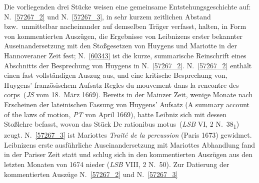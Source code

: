 %  
%
%
%
%
%
\frenchspacing
%
\begin{ledgroup}
\footnotesize
\pstart
\noindent
%
Die vorliegenden drei Stücke weisen eine gemeinsame Entstehungsgeschichte auf:
%
N.~\ref{57267_2} und N.~\ref{57267_3}, in sehr kurzem zeitlichen Abstand bzw.\ unmittelbar nacheinander auf demselben Träger verfasst,
%
halten, in Form von kommentierten Auszügen, die Ergebnisse von Leibnizens erster bekannter Auseinandersetzung mit den Stoßgesetzen von 
%
\protect{}Huygens und \protect{}Mariotte 
%
in der Hannoveraner Zeit fest;
%
N.~\ref{60343} ist die kurze, summarische Reinschrift eines Abschnitts der Besprechung von
%
\protect{}Huygens in N.~\ref{57267_2}.
\pend
%
\pstart
N.~\ref{57267_2} enthält einen fast vollständigen Auszug aus, und eine kritische Besprechung von, Huygens' französischem Aufsatz
%
\cite{00529}\glqq Regles du mouvement dans la rencontre des corps\grqq\ (\cite{00157}\textit{JS} vom 18.~März 1669).
%
Bereits in der Mainzer Zeit, wenige Monate nach Erscheinen der lateinischen Fassung von \protect{}Huygens' Aufsatz
%
(\cite{01067}\glqq A summary account of the laws of motion\grqq, \cite{00158}\textit{PT} von April 1669),
%
hatte Leibniz sich mit dessen Stoßlehre befasst, wovon das Stück 
%
\glqq De rationibus motus\grqq\ (\cite{02025}\textit{LSB} VI, 2 N.~38\textsubscript{1}) zeugt. 
%
N.~\ref{57267_3} ist \protect{}Mariottes \cite{00311}\textit{Traité de la percussion} (Paris 1673) gewidmet.
%
Leibnizens erste ausführliche Auseinandersetzung mit \protect{}Mariottes \cite{00311}Abhandlung
%
fand in der Pariser Zeit statt und schlug sich in den kommentierten Auszügen aus den letzten Monaten von 1674 nieder (\cite{01292}\textit{LSB} VIII, 2 N.~50).
\pend
%
\pstart
Zur Datierung der kommentierten Auszüge N.~\ref{57267_2} und N.~\ref{57267_3} 

\end{ledgroup}
